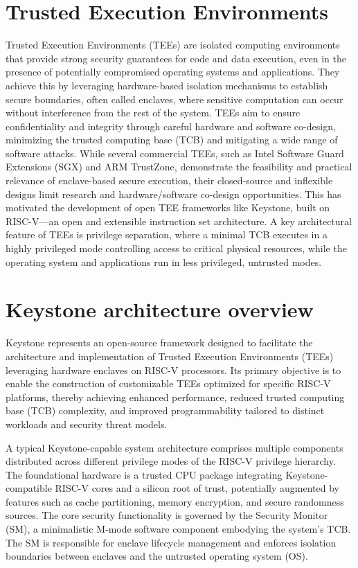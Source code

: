\section{Trusted Execution Environments}
Trusted Execution Environments (TEEs) are isolated computing environments that provide strong security guarantees for code and data execution, even in the presence of potentially compromised operating systems and applications. They achieve this by leveraging hardware-based isolation mechanisms to establish secure boundaries, often called enclaves, where sensitive computation can occur without interference from the rest of the system. TEEs aim to ensure confidentiality and integrity through careful hardware and software co-design, minimizing the trusted computing base (TCB) and mitigating a wide range of software attacks. While several commercial TEEs, such as Intel Software Guard Extensions (SGX) and ARM TrustZone, demonstrate the feasibility and practical relevance of enclave-based secure execution, their closed-source and inflexible designs limit research and hardware/software co-design opportunities. This has motivated the development of open TEE frameworks like Keystone, built on RISC-V—an open and extensible instruction set architecture. A key architectural feature of TEEs is privilege separation, where a minimal TCB executes in a highly privileged mode controlling access to critical physical resources, while the operating system and applications run in less privileged, untrusted modes.

\section{Keystone architecture overview}

Keystone represents an open-source framework designed to facilitate the architecture and implementation of Trusted Execution Environments (TEEs) leveraging hardware enclaves on RISC-V processors. Its primary objective is to enable the construction of customizable TEEs optimized for specific RISC-V platforms, thereby achieving enhanced performance, reduced trusted computing base (TCB) complexity, and improved programmability tailored to distinct workloads and security threat models.

A typical Keystone-capable system architecture comprises multiple components distributed across different privilege modes of the RISC-V privilege hierarchy. The foundational hardware is a trusted CPU package integrating Keystone-compatible RISC-V cores and a silicon root of trust, potentially augmented by features such as cache partitioning, memory encryption, and secure randomness sources. The core security functionality is governed by the Security Monitor (SM), a minimalistic M-mode software component embodying the system's TCB. The SM is responsible for enclave lifecycle management and enforces isolation boundaries between enclaves and the untrusted operating system (OS).

